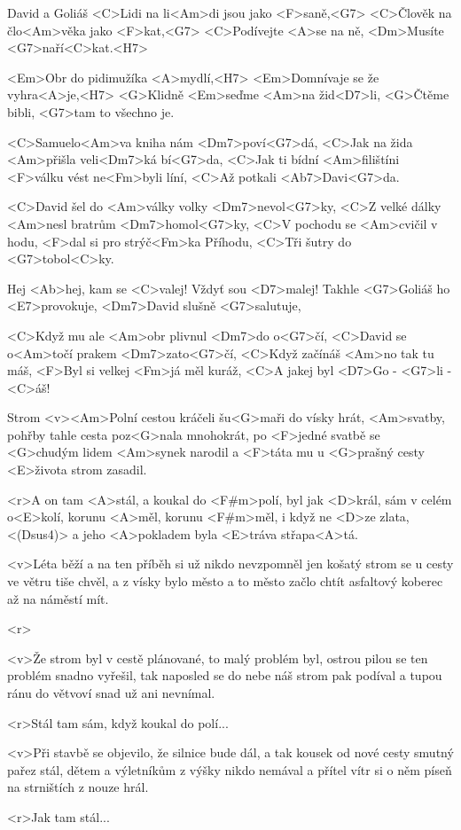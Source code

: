 \begin{song}{86}{David a Goliáš}{}
	<C>Lidi na li<Am>di jsou jako <F>saně,<G7>
	<C>Člověk na člo<Am>věka jako <F>kat,<G7>
	<C>Podívejte <A>se na ně,
	<Dm>Musíte <G7>naří<C>kat.<H7>

	<Em>Obr do pidimužíka <A>mydlí,<H7>
	<Em>Domnívaje se že vyhra<A>je,<H7>
	<G>Klidně <Em>seďme <Am>na žid<D7>li,
	<G>Čtěme bibli, <G7>tam to všechno je.

	<C>Samuelo<Am>va kniha nám <Dm7>poví<G7>dá,
	<C>Jak na žida <Am>přišla veli<Dm7>ká bí<G7>da,
	<C>Jak ti bídní <Am>filištíni <F>válku vést ne<Fm>byli líní,
	<C>Až potkali <Ab7>Davi<G7>da.

	<C>David šel do <Am>války volky <Dm7>nevol<G7>ky,
	<C>Z velké dálky <Am>nesl bratrům <Dm7>homol<G7>ky,
	<C>V pochodu se <Am>cvičil v hodu, <F>dal si pro strýč<Fm>ka Příhodu,
	<C>Tři šutry do <G7>tobol<C>ky.

	Hej <Ab>hej, kam se <C>valej!
	Vždyť sou <D7>malej!
	Takhle <G7>Goliáš ho <E7>provokuje,
	<Dm7>David slušně <G7>salutuje,

	<C>Když mu ale <Am>obr plivnul <Dm7>do o<G7>čí,
	<C>David se o<Am>točí prakem <Dm7>zato<G7>čí,
	<C>Když začínáš <Am>no tak tu máš,
	<F>Byl si velkej <Fm>já měl kuráž,
	<C>A jakej byl <D7>Go - <G7>li - <C>áš!
\end{song}

\begin{song}[Ozvěna]{88}{Strom}{}
	<v><Am>Polní cestou kráčeli šu<G>maři do vísky hrát,
	<Am>svatby, pohřby tahle cesta poz<G>nala mnohokrát,
	po <F>jedné svatbě se <G>chudým lidem <Am>synek narodil
	a <F>táta mu u <G>prašný cesty <E>života strom zasadil.

	<r>A on tam <A>stál, a koukal do <F#m>polí,
	byl jak <D>král, sám v celém o<E>kolí,
	korunu <A>měl, korunu <F#m>měl, i když ne <D>ze zlata,<(Dsus4)>
	a jeho <A>pokladem byla <E>tráva střapa<A>tá.

	<v>Léta běží a na ten příběh si už nikdo nevzpomněl
	jen košatý strom se u cesty ve větru tiše chvěl,
	a z vísky bylo město a to město začlo chtít
	asfaltový koberec až na náměstí mít.

	<r>

	<v>Že strom byl v cestě plánované, to malý problém byl,
	ostrou pilou se ten problém snadno vyřešil,
	tak naposled se do nebe náš strom pak podíval
	a tupou ránu do větvoví snad už ani nevnímal.

	<r>Stál tam sám, když koukal do polí...

	<v>Při stavbě se objevilo, že silnice bude dál,
	a tak kousek od nové cesty smutný pařez stál,
	dětem a výletníkům z výšky nikdo nemával
	a přítel vítr si o něm píseň na strništích z nouze hrál.

	<r>Jak tam stál...
\end{song}

